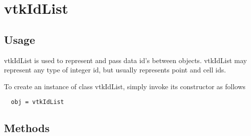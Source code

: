 \section{vtkIdList}

\subsection{Usage}

 vtkIdList is used to represent and pass data id's between
 objects. vtkIdList may represent any type of integer id, but
 usually represents point and cell ids.

To create an instance of class vtkIdList, simply
invoke its constructor as follows
\begin{verbatim}
  obj = vtkIdList
\end{verbatim}
\subsection{Methods}

